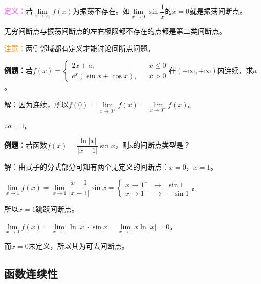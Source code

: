 \documentclass[UTF8, 12pt]{ctexart}
\begin{document}
\begin{minipage}{0.6\linewidth}
    \textcolor{violet}{\textbf{定义：}}若$\lim\limits_{x\to x_0}f(x)$为振荡不存在。如$\lim\limits_{x\to 0}\sin\dfrac{1}{x}$的$x=0$就是振荡间断点。
\end{minipage}
\hfill
\begin{minipage}{0.3\linewidth}
\end{minipage}

无穷间断点与振荡间断点的左右极限都不存在的点都是第二类间断点。

\textcolor{orange}{注意：}两侧邻域都有定义才能讨论间断点问题。\medskip

\textbf{例题：}若$f(x)=\left\{
    \begin{array}{lcl}
    2x+a, & & x\leqslant 0 \\
        e^x(\sin x+\cos x), & & x>0
    \end{array} \right.
$在$(-\infty,+\infty)$内连续，求$a$。

解：因为连续，所以$f(0)=\lim\limits_{x\to 0^+}f(x)=\lim\limits_{x\to 0^-}f(x)$。

$\therefore a=1$。

\textbf{例题：}若函数$f(x)=\dfrac{\ln\vert x\vert}{\vert x-1\vert}\sin x$，则x的间断点类型是？\medskip

解：由式子的分式部分可知有两个无定义的间断点：$x=0$，$x=1$。\medskip

$\lim\limits_{x\to 1}f(x)=\lim\limits_{x\to 1}\dfrac{x-1}{\vert x-1\vert}\sin x=\left\{
    \begin{array}{lcl}
        x\to 1^+ & \rightarrow & \sin 1 \\
        x\to 1^- & \rightarrow & -\sin 1
    \end{array} \right.
$。

所以$x=1$跳跃间断点。

$\lim\limits_{x\to 0}f(x)=\lim\limits_{x\to 0}\ln\vert x\vert\cdot\sin x=\lim\limits_{x\to 0}x\ln\vert x\vert=0$。

而$x=0$未定义，所以其为可去间断点。

\subsection{函数连续性}
\end{document}
